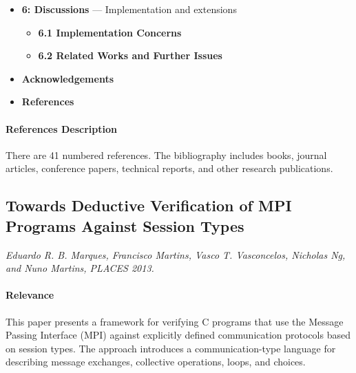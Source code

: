 \documentclass{article}
\begin{document}
\begin{itemize}
\begin{itemize}
        \item \textbf{5.3 Examples}
    \end{itemize}

    \item \textbf{6: Discussions} --- Implementation and extensions
    \begin{itemize}
        \item \textbf{6.1 Implementation Concerns}

        \item \textbf{6.2 Related Works and Further Issues}
    \end{itemize}

    \item \textbf{Acknowledgements}

    \item \textbf{References}
\end{itemize}

\paragraph{References Description}
There are 41 numbered references. The bibliography includes books, journal articles,
conference papers, technical reports, and other research publications.


\subsection{Towards Deductive Verification of MPI Programs Against Session Types}
\textit{Eduardo R. B. Marques, Francisco Martins, Vasco T. Vasconcelos, Nicholas Ng, and Nuno Martins, PLACES 2013.}~\cite{marques-et-al-2013}

\paragraph{Relevance}
This paper presents a framework for verifying C programs that use the Message Passing Interface (MPI) against explicitly defined communication protocols based on session types. The approach introduces a communication-type language for describing message exchanges, collective operations, loops, and choices.
\end{document}
